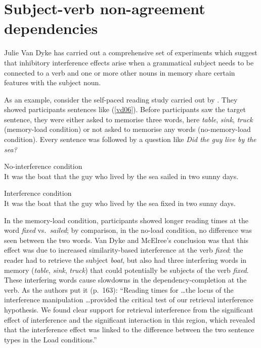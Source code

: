 \documentclass{cambridge7A}\usepackage[]{graphicx}\usepackage[]{color}
\begin{document}
\section{Subject-verb non-agreement dependencies}

Julie Van Dyke has carried out a comprehensive set of experiments which suggest that inhibitory interference effects arise when a grammatical subject needs to be connected to a verb and one or more other nouns in memory share certain features with the subject noun.

 As an example, consider the self-paced reading study  carried out by \cite{vandykemcelree06}.  They  showed participants sentences like (\ref{vd06}). Before  participants saw the target sentence, they were either asked to memorise three words, here \textit{table}, \textit{sink}, \textit{truck} (memory-load condition) or not asked to memorise any words (no-memory-load condition). Every sentence was followed by a question like \textit{Did the guy live by the sea?}
 
 \begin{exe}
\ex \label{vd06}
\begin{xlist}
\item No-interference condition\\
It was the boat that the guy who lived by the sea sailed in two sunny days.
\item Interference condition \\
It was the boat that the guy who lived by the sea fixed in two sunny days.
\end{xlist}
\end{exe}

In the memory-load condition, participants showed longer reading times at the word \textit{fixed} vs.\ \textit{sailed}; by comparison, in the no-load condition, no difference was seen between the two words. Van Dyke and McElree's conclusion was that this effect was due to increased  similarity-based interference at the verb \textit{fixed}: the reader had to retrieve the subject \textit{boat}, but also had three interfering words in memory (\textit{table}, \textit{sink}, \textit{truck}) that could potentially be subjects of the verb \textit{fixed}. These interfering words cause slowdowns in the dependency-completion at the verb. As the authors put it (p.\ 163): ``Reading times for \dots the locus of the interference manipulation \dots provided the critical test of our retrieval interference hypothesis. We found clear support for retrieval interference from the significant effect of interference and the significant interaction in this region, which revealed that the interference effect was linked to the difference between the two sentence types in the Load conditions.''
\end{document}
